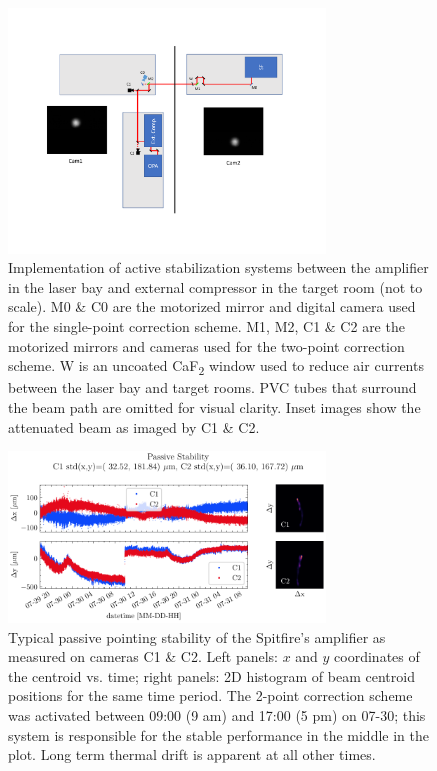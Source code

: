 \begin{figure}
	\centering
	\includegraphics[width=0.75\textwidth]{figures/chap2/guidestar_geometry.pdf}
	\caption{Implementation of active stabilization systems between the amplifier in the laser bay and external compressor in the target room (not to scale). M0 \& C0 are the motorized mirror and digital camera used for the single-point correction scheme. M1, M2, C1 \& C2 are the motorized mirrors and cameras used for the two-point correction scheme. W is an uncoated CaF\textsubscript{2} window used to reduce air currents between the laser bay and target rooms. PVC tubes that surround the beam path are omitted for visual clarity. Inset images show the attenuated beam as imaged by C1 \& C2.}
	\label{fig:guidestar_geometry}
\end{figure}

\begin{figure}
	\centering
	\includegraphics[width=0.75\textwidth]{figures/chap2/Stability_NoCorrection.pdf}
	\caption{Typical passive pointing stability of the Spitfire's amplifier as measured on cameras C1 \& C2. Left panels: $x$ and $y$ coordinates of the centroid vs. time; right panels: 2D histogram of beam centroid positions for the same time period. The 2-point correction scheme was activated between 09:00 (9 am) and 17:00 (5 pm) on 07-30; this system is responsible for the stable performance in the middle in the plot. Long term thermal drift is apparent at all other times.}
	\label{fig:guidestar_passive_stability}
\end{figure}

